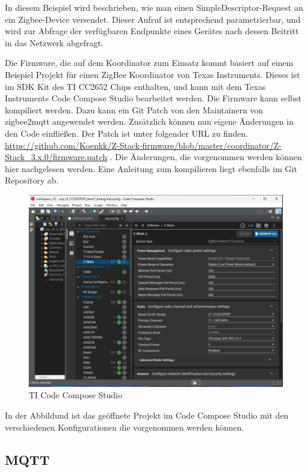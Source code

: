 In diesem Beispiel wird beschrieben, wie man einen SimpleDescriptor-Request an ein Zigbee-Device versendet. Dieser Aufruf ist entsprechend parametrierbar,
und wird zur Abfrage der verfügbaren Endpunkte eines Gerätes nach dessen Beitritt in das Netzwerk abgefragt.

Die Firmware, die auf dem Koordinator zum Einsatz kommt basiert auf einem Beispiel Projekt für einen ZigBee Koordinator von Texas Instruments. Dieses ist
im SDK Kit des TI CC2652 Chips enthalten, und kann mit dem Texas Instruments Code Compose Studio bearbeitet werden. Die Firmware kann selbst kompiliert werden.
Dazu kann ein Git Patch von den Maintainern von zigbee2mqtt angewendet werden. Zusätzlich können nun eigene Änderungen in den Code einfließen. Der Patch ist unter
folgender URL zu finden.
\url{https://github.com/Koenkk/Z-Stack-firmware/blob/master/coordinator/Z-Stack_3.x.0/firmware.patch} .
Die Änderungen, die vorgenommen werden können hier nachgelesen werden. Eine Anleitung zum kompilieren liegt ebenfalls im Git Repository ab.

\begin{figure}[H]
  \centering
  \includegraphics[width=1\textwidth]{media/cc-device.png}
  \caption{TI Code Compose Studio}
\end{figure}
In der Abbildund ist das geöffnete Projekt im Code Compose Studio mit den verschiedenen Konfigurationen die vorgenommen werden können.

\subsection{MQTT}


